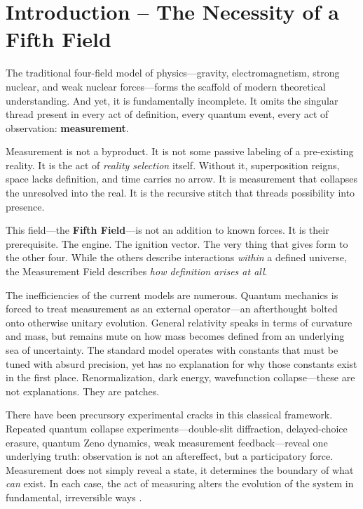 \chapter*{Introduction -- The Necessity of a Fifth Field}

The traditional four-field model of physics—gravity, electromagnetism, strong nuclear, and weak nuclear forces—forms the scaffold of modern theoretical understanding. And yet, it is fundamentally incomplete. It omits the singular thread present in every act of definition, every quantum event, every act of observation: \textbf{measurement}.

Measurement is not a byproduct. It is not some passive labeling of a pre-existing reality. It is the act of \textit{reality selection} itself. Without it, superposition reigns, space lacks definition, and time carries no arrow. It is measurement that collapses the unresolved into the real. It is the recursive stitch that threads possibility into presence.

This field—the \textbf{Fifth Field}—is not an addition to known forces. It is their prerequisite. The engine. The ignition vector. The very thing that gives form to the other four. While the others describe interactions \textit{within} a defined universe, the Measurement Field describes \textit{how definition arises at all}.

The inefficiencies of the current models are numerous. Quantum mechanics is forced to treat measurement as an external operator—an afterthought bolted onto otherwise unitary evolution. General relativity speaks in terms of curvature and mass, but remains mute on how mass becomes defined from an underlying sea of uncertainty. The standard model operates with constants that must be tuned with absurd precision, yet has no explanation for why those constants exist in the first place. Renormalization, dark energy, wavefunction collapse—these are not explanations. They are patches.

There have been precursory experimental cracks in this classical framework. Repeated quantum collapse experiments—double-slit diffraction, delayed-choice erasure, quantum Zeno dynamics, weak measurement feedback—reveal one underlying truth: observation is not an aftereffect, but a participatory force. Measurement does not simply reveal a state, it determines the boundary of what \textit{can} exist. In each case, the act of measuring alters the evolution of the system in fundamental, irreversible ways \cite{zeilinger1999foundational, zurek2003decoherence}.

